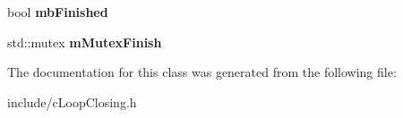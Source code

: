 \begin{DoxyCompactItemize}
\item 
bool {\bfseries mb\+Finished}\hypertarget{classMultiColSLAM_1_1cLoopClosing_a8398cc72be69bb599da8ed71a92ea491}{}\label{classMultiColSLAM_1_1cLoopClosing_a8398cc72be69bb599da8ed71a92ea491}

\item 
std\+::mutex {\bfseries m\+Mutex\+Finish}\hypertarget{classMultiColSLAM_1_1cLoopClosing_ad77240c8ed43c27d3533555ca2b4a4e8}{}\label{classMultiColSLAM_1_1cLoopClosing_ad77240c8ed43c27d3533555ca2b4a4e8}

\end{DoxyCompactItemize}


The documentation for this class was generated from the following file\+:\begin{DoxyCompactItemize}
\item 
include/c\+Loop\+Closing.\+h\end{DoxyCompactItemize}
